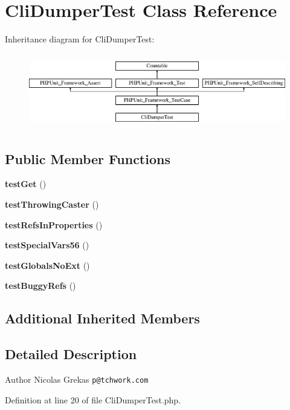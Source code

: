\section{Cli\+Dumper\+Test Class Reference}
\label{class_symfony_1_1_component_1_1_var_dumper_1_1_tests_1_1_cli_dumper_test}
Inheritance diagram for Cli\+Dumper\+Test\+:\begin{figure}[H]
\begin{center}
\leavevmode
\includegraphics[height=3.303835cm]{class_symfony_1_1_component_1_1_var_dumper_1_1_tests_1_1_cli_dumper_test}
\end{center}
\end{figure}
\subsection*{Public Member Functions}
\begin{DoxyCompactItemize}
\item 
{\bf test\+Get} ()
\item 
{\bf test\+Throwing\+Caster} ()
\item 
{\bf test\+Refs\+In\+Properties} ()
\item 
{\bf test\+Special\+Vars56} ()
\item 
{\bf test\+Globals\+No\+Ext} ()
\item 
{\bf test\+Buggy\+Refs} ()
\end{DoxyCompactItemize}
\subsection*{Additional Inherited Members}


\subsection{Detailed Description}
\begin{DoxyAuthor}{Author}
Nicolas Grekas {\tt p@tchwork.\+com} 
\end{DoxyAuthor}


Definition at line 20 of file Cli\+Dumper\+Test.\+php.




